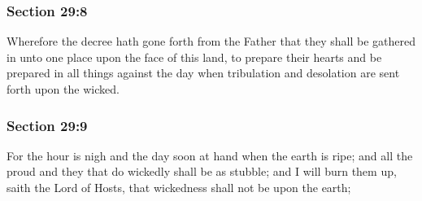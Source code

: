 
	\subsubsection{Section 29:8} %
		\label{DC29-8}

		Wherefore the decree hath gone forth from the Father that they shall be gathered in unto one place upon the face of this land, to prepare their hearts and be prepared in all things against the day when tribulation and desolation are sent forth upon the wicked.


	\subsubsection{Section 29:9} %
		\label{DC29-9}

		For the hour is nigh and the day soon at hand when the earth is ripe; and all the proud and they that do wickedly shall be as stubble; and I will burn them up, saith the Lord of Hosts, that wickedness shall not be upon the earth;


